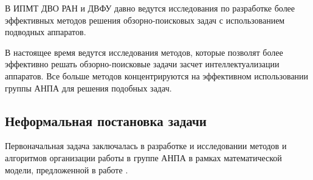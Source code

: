 \documentclass[a4paper,14pt,russian]{article}
\begin{document}
В ИПМТ ДВО РАН и ДВФУ давно ведутся исследования по разработке более эффективных методов решения обзорно-поисковых задач с использованием подводных аппаратов.

В настоящее время ведутся исследования методов, которые позволят более эффективно решать обзорно-поисковые задачи засчет интеллектуализации аппаратов.
Все больше методов концентрируются на эффективном использовании группы АНПА для решения подобных задач.


\subsection{Неформальная постановка задачи}


Первоначальная задача заключалась в разработке и исследовании методов и алгоритмов организации работы в группе АНПА в рамках математической модели, предложенной в работе \cite{tuphanov}.




\end{document}
